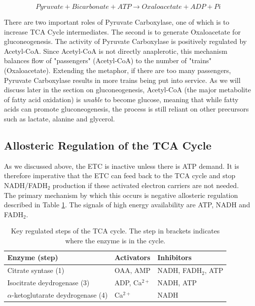 \documentclass{tufte-handout}
\begin{document}
\begin{equation}\label{eq:pcx}
Pyruvate + Bicarbonate + ATP \rightarrow Oxaloacetate + ADP + Pi
\end{equation}

There are two important roles of Pyruvate Carboxylase, one of which is to increase TCA Cycle intermediates.  The second is to generate Oxaloacetate for gluconeogenesis.  The activity of Pyruvate Carboxylase is positively regulated by Acetyl-CoA.  Since Acetyl-CoA is not directly anaplerotic, this mechanism balances flow of "passengers" (Acetyl-CoA) to the number of "trains" (Oxaloacetate).  Extending the metaphor, if there are too many passengers, Pyruvate Carboxylase results in more trains being put into service.  As we will discuss later in the section on gluconeogenesis, Acetyl-CoA (the major metabolite of fatty acid oxidation) is \emph{unable} to become glucose, meaning that while fatty acids can promote gluconeogenesis, the process is still reliant on other precursors such as lactate, alanine and glycerol.

\subsection{Allosteric Regulation of the TCA Cycle}

As we discussed above, the ETC is inactive unless there is ATP demand.  It is therefore imperative that the ETC can feed back to the TCA cycle and stop NADH/FADH$_2$ production if these activated electron carriers are not needed.  The primary mechanism by which this occurs is negative allosteric regulation described in Table \ref{tab:tca-allosteric}.  The signals of high energy availability are ATP, NADH and FADH$_2$.

\begin{table}
\centering
\caption{Key regulated steps of the TCA cycle.  The step in brackets indicates where the enzyme is in the cycle.}
\label{tab:tca-allosteric}
\begin{tabular}{lll}
\hline
\textbf {Enzyme (step)} & \textbf{Activators} & \textbf{Inhibitors}\\
\hline
Citrate syntase (1) & OAA, AMP & NADH, FADH$_2$, ATP\\
Isocitrate deydrogenase (3) & ADP, Ca$^{2+}$ &  NADH, ATP\\
$\alpha$-ketoglutarate deydrogenase (4) & Ca$^{2+}$ &  NADH\\
\hline
\end{tabular}
\end{table}
\end{document}
